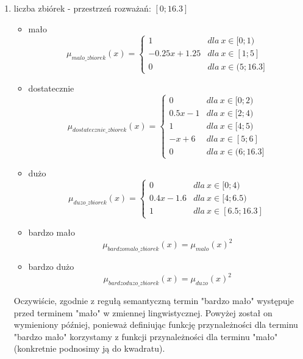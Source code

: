 \documentclass{classrep}
\begin{document}
\begin{enumerate}
    \item liczba zbiórek - przestrzeń rozważań: $[0;16.3]$
    \begin{itemize}
        \item mało
        \begin{equation}
            \mu_{malo\_zbiorek}(x) = \left\{\begin{matrix} 1 & dla \: x\in[0;1) \\ -0.25x + 1.25 & dla \: x\in [1; 5] \\ 0 & dla \: x\in (5;16.3] \end{matrix}\right.
        \end{equation}
         \item dostatecznie
        \begin{equation}
            \mu_{dostatecznie\_zbiorek}(x) = \left\{\begin{matrix}0 & dla \: x\in [0;2) \\ 0.5x - 1 & dla \: x\in[2;4) \\ 1 & dla \: x\in [4; 5) \\ -x + 6 & dla \: x\in [5;6]\\ 0 & dla \: x\in (6;16.3]  \end{matrix}\right.
        \end{equation}
        \item dużo
        \begin{equation}
            \mu_{duzo\_zbiorek}(x) = \left\{\begin{matrix} 0 & dla \: x\in [0;4) \\ 0.4x - 1.6 & dla \: x\in[4;6.5) \\ 1 & dla \: x\in [6.5; 16.3] \end{matrix}\right.
        \end{equation}
        \item bardzo mało
        \begin{equation}
            \mu_{bardzomalo\_zbiorek}(x) = \mu_{malo}(x)^2
        \end{equation}
        \item bardzo dużo
        \begin{equation}
            \mu_{bardzoduzo\_zbiorek}(x) = \mu_{duzo}(x)^2
        \end{equation}
    \end{itemize}
    Oczywiście, zgodnie z regułą semantyczną termin "bardzo mało" występuje przed terminem "mało" w zmiennej lingwistycznej. Powyżej został on wymieniony później, ponieważ definiując funkcję przynależności dla terminu "bardzo mało" korzystamy z funkcji przynależności dla terminu "mało" (konkretnie podnosimy ją do kwadratu).

\end{enumerate}
\end{document}
